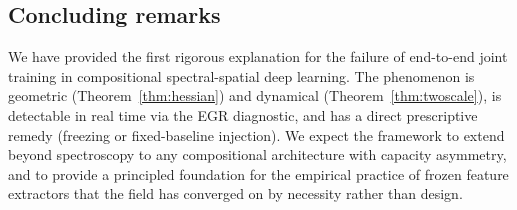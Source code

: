 \subsection{Concluding remarks}

We have provided the first rigorous explanation for the failure of
end-to-end joint training in compositional spectral-spatial deep
learning. The phenomenon is geometric (Theorem~\ref{thm:hessian}) and
dynamical (Theorem~\ref{thm:twoscale}), is detectable in real time via
the EGR diagnostic, and has a direct prescriptive remedy (freezing or
fixed-baseline injection). We expect the framework to extend beyond
spectroscopy to any compositional architecture with capacity asymmetry,
and to provide a principled foundation for the empirical practice of
frozen feature extractors that the field has converged on by
necessity rather than design.
